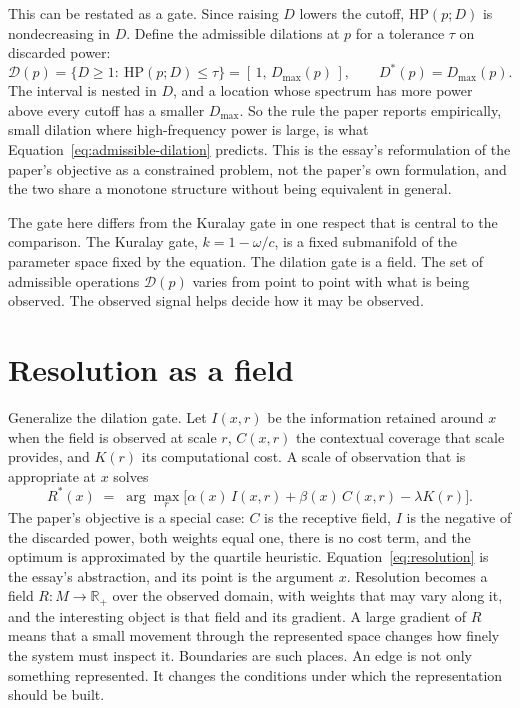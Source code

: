 \documentclass[11pt]{article}
\theoremstyle{definition}
\theoremstyle{remark}
\newcommand{\HP}{\mathrm{HP}}
\begin{document}
This can be restated as a gate. Since raising $D$ lowers the cutoff, $\HP(p;D)$ is nondecreasing in $D$. Define the admissible dilations at $p$ for a tolerance $\tau$ on discarded power:
\begin{equation}
  \mathcal D(p)=\{D\ge1:\ \HP(p;D)\le\tau\}=[\,1,\,D_{\max}(p)\,],\qquad
  D^{*}(p)=D_{\max}(p).
  \label{eq:admissible-dilation}
\end{equation}
The interval is nested in $D$, and a location whose spectrum has more power above every cutoff has a smaller $D_{\max}$. So the rule the paper reports empirically, small dilation where high-frequency power is large, is what Equation~\eqref{eq:admissible-dilation} predicts. This is the essay's reformulation of the paper's objective as a constrained problem, not the paper's own formulation, and the two share a monotone structure without being equivalent in general.

The gate here differs from the Kuralay gate in one respect that is central to the comparison. The Kuralay gate, $k=1-\omega/c$, is a fixed submanifold of the parameter space fixed by the equation. The dilation gate is a field. The set of admissible operations $\mathcal D(p)$ varies from point to point with what is being observed. The observed signal helps decide how it may be observed.

\section{Resolution as a field}

Generalize the dilation gate. Let $I(x,r)$ be the information retained around $x$ when the field is observed at scale $r$, $C(x,r)$ the contextual coverage that scale provides, and $K(r)$ its computational cost. A scale of observation that is appropriate at $x$ solves
\begin{equation}
  R^{*}(x)\;=\;\arg\max_{r}\Big[\alpha(x)\,I(x,r)+\beta(x)\,C(x,r)-\lambda K(r)\Big].
  \label{eq:resolution}
\end{equation}
The paper's objective is a special case: $C$ is the receptive field, $I$ is the negative of the discarded power, both weights equal one, there is no cost term, and the optimum is approximated by the quartile heuristic. Equation~\eqref{eq:resolution} is the essay's abstraction, and its point is the argument $x$. Resolution becomes a field $R:M\to\mathbb R_{+}$ over the observed domain, with weights that may vary along it, and the interesting object is that field and its gradient. A large gradient of $R$ means that a small movement through the represented space changes how finely the system must inspect it. Boundaries are such places. An edge is not only something represented. It changes the conditions under which the representation should be built.
\end{document}
